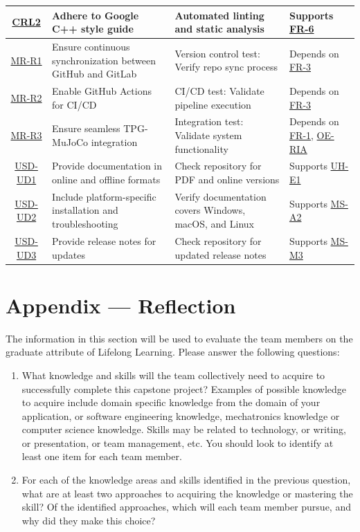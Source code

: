 \documentclass[12pt]{article}
\begin{document}
\begin{landscape}
\begin{longtable}{|c|p{6cm}|p{5cm}|p{4cm}|}
    \hyperref[CRL2]{CRL2} & Adhere to Google C++ style guide & Automated linting and static analysis & Supports \hyperref[FR-6]{FR-6} \\
    \hline
    \hyperref[MR-R1]{MR-R1} & Ensure continuous synchronization between GitHub and GitLab & Version control test: Verify repo sync process & Depends on \hyperref[FR-3]{FR-3} \\
    \hline
    \hyperref[MR-R2]{MR-R2} & Enable GitHub Actions for CI/CD & CI/CD test: Validate pipeline execution & Depends on \hyperref[FR-3]{FR-3} \\
    \hline
    \hyperref[MR-R3]{MR-R3} & Ensure seamless TPG-MuJoCo integration & Integration test: Validate system functionality & Depends on \hyperref[FR-1]{FR-1}, \hyperref[OE-RIA]{OE-RIA} \\
    \hline
    \hyperref[USD-UD1]{USD-UD1} & Provide documentation in online and offline formats & Check repository for PDF and online versions & Supports \hyperref[UH-E1]{UH-E1} \\
    \hline
    \hyperref[USD-UD2]{USD-UD2} & Include platform-specific installation and troubleshooting & Verify documentation covers Windows, macOS, and Linux & Supports \hyperref[MS-A2]{MS-A2} \\
    \hline
    \hyperref[USD-UD3]{USD-UD3} & Provide release notes for updates & Check repository for updated release notes & Supports \hyperref[MS-M3]{MS-M3} \\
    \hline
  \end{longtable}
\end{landscape}
\newpage{}
\section*{Appendix --- Reflection}

The information in this section will be used to evaluate the team members on the
graduate attribute of Lifelong Learning.  Please answer the following questions:

\begin{enumerate}
  \item What knowledge and skills will the team collectively need to acquire to
  successfully complete this capstone project?  Examples of possible knowledge
  to acquire include domain specific knowledge from the domain of your
  application, or software engineering knowledge, mechatronics knowledge or
  computer science knowledge.  Skills may be related to technology, or writing,
  or presentation, or team management, etc.  You should look to identify at
  least one item for each team member.
  \item For each of the knowledge areas and skills identified in the previous
  question, what are at least two approaches to acquiring the knowledge or
  mastering the skill?  Of the identified approaches, which will each team
  member pursue, and why did they make this choice?
\end{enumerate}
\end{document}
